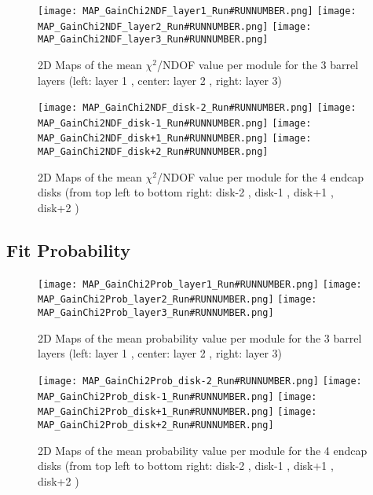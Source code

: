 \documentclass[a4paper,10pt]{article}
\begin{document}
\begin{figure}[htp]
 \centering
\subfigure
 {\texttt{[image: MAP\_GainChi2NDF\_layer1\_Run\#RUNNUMBER.png]}}
\subfigure
 {\texttt{[image: MAP\_GainChi2NDF\_layer2\_Run\#RUNNUMBER.png]}}
\subfigure
 {\texttt{[image: MAP\_GainChi2NDF\_layer3\_Run\#RUNNUMBER.png]}}
\caption{2D Maps of the mean $\chi^2$/NDOF value per module for the 3 barrel layers (left: layer 1 , center: layer 2 , right: layer 3)}
\end{figure}

\begin{figure}[htp]
 \centering
\subfigure
 {\texttt{[image: MAP\_GainChi2NDF\_disk-2\_Run\#RUNNUMBER.png]}}
\subfigure
 {\texttt{[image: MAP\_GainChi2NDF\_disk-1\_Run\#RUNNUMBER.png]}}
\subfigure
 {\texttt{[image: MAP\_GainChi2NDF\_disk+1\_Run\#RUNNUMBER.png]}}
\subfigure
 {\texttt{[image: MAP\_GainChi2NDF\_disk+2\_Run\#RUNNUMBER.png]}}
\caption{2D Maps of the mean $\chi^2$/NDOF value per module for the 4 endcap disks (from top left to bottom right: disk-2 , disk-1 , disk+1 , disk+2 )}
\end{figure}


\pagebreak





\subsection{Fit Probability}

\begin{figure}[htp]
 \centering
\subfigure
 {\texttt{[image: MAP\_GainChi2Prob\_layer1\_Run\#RUNNUMBER.png]}}
\subfigure
 {\texttt{[image: MAP\_GainChi2Prob\_layer2\_Run\#RUNNUMBER.png]}}
\subfigure
 {\texttt{[image: MAP\_GainChi2Prob\_layer3\_Run\#RUNNUMBER.png]}}
\caption{2D Maps of the mean probability value per module for the 3 barrel layers (left: layer 1 , center: layer 2 , right: layer 3)}
\end{figure}

\begin{figure}[htp]
 \centering
\subfigure
 {\texttt{[image: MAP\_GainChi2Prob\_disk-2\_Run\#RUNNUMBER.png]}}
\subfigure
 {\texttt{[image: MAP\_GainChi2Prob\_disk-1\_Run\#RUNNUMBER.png]}}
\subfigure
 {\texttt{[image: MAP\_GainChi2Prob\_disk+1\_Run\#RUNNUMBER.png]}}
\subfigure
 {\texttt{[image: MAP\_GainChi2Prob\_disk+2\_Run\#RUNNUMBER.png]}}
\caption{2D Maps of the mean probability value per module for the 4 endcap disks (from top left to bottom right: disk-2 , disk-1 , disk+1 , disk+2 )}
\end{figure}


\pagebreak
\end{document}
